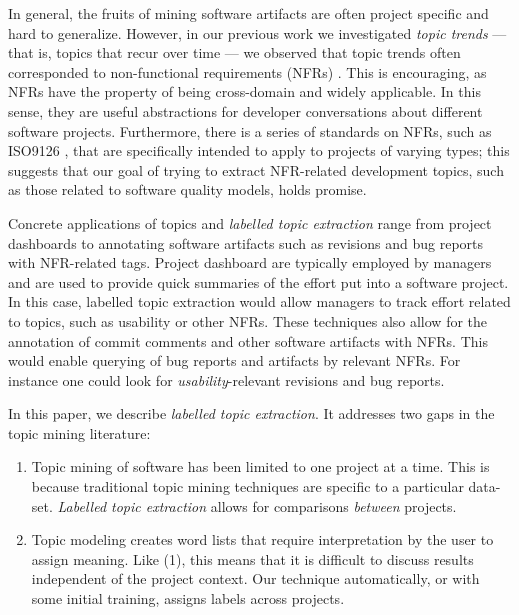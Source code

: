 \documentclass[]{sig-alternate}
\begin{document}


In general, the fruits of mining software artifacts are often project specific and hard to generalize.  However, in our previous work we investigated \emph{topic trends} --- that is, topics that recur over time --- we observed that topic trends often corresponded to non-functional requirements (NFRs) \cite{Hindle09ICSM}.  This is encouraging, as NFRs have the property of being cross-domain and widely applicable. In this sense, they are useful abstractions for developer conversations about different software projects.  Furthermore, there is a series of standards on NFRs, such as ISO9126 \cite{iso9126}, that are specifically intended to apply to projects of varying types; this suggests that our goal of trying to extract NFR-related development topics, such as those related to software quality models, holds promise.

Concrete applications of topics and \emph{labelled topic extraction}
range from project dashboards to annotating software artifacts such as revisions and bug reports with
NFR-related tags.
Project dashboard are typically employed by managers and are used to
provide quick summaries of the effort put into a software project. In this case, 
labelled topic extraction would allow managers to track effort
related to topics, such as usability or other NFRs.
These techniques also allow for the annotation of commit comments
 and other software artifacts with NFRs. 
This would enable querying of bug reports and artifacts by relevant NFRs. 
For instance one could look
for \emph{usability}-relevant revisions and bug reports.


In this paper, we describe \emph{labelled topic extraction}. It addresses two gaps in the topic mining literature:
\begin{enumerate}
  \item Topic mining of software has been limited to one project at a time. 
This is because traditional topic mining techniques are specific to a particular data-set. 
\textit{Labelled topic extraction} allows for comparisons \textit{between} projects. 
  \item Topic modeling creates word lists that require interpretation by the user to assign meaning. 
Like (1), this means
that it is difficult to discuss results independent of the project context. 
Our technique automatically, or with some initial training, assigns labels across projects.
\end{enumerate}
\end{document}
